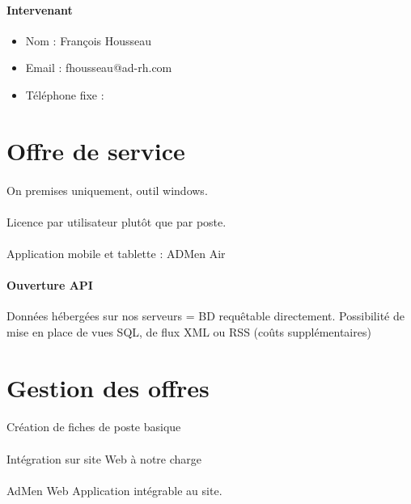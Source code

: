 \paragraph{Intervenant}
\begin{itemize}
	\item Nom : François Housseau
	\item Email : fhousseau@ad-rh.com
	\item Téléphone fixe :
\end{itemize}


\section{Offre de service}
\paragraph{} On premises uniquement, outil windows.

\paragraph{} Licence par utilisateur plutôt que par poste.
\paragraph{} Application mobile et tablette  : ADMen Air
\paragraph{Ouverture API} Données hébergées sur nos serveurs = BD requêtable directement. Possibilité de mise en place de vues SQL, de flux XML ou RSS (coûts supplémentaires)

\section{Gestion des offres}
\paragraph{} Création de fiches de poste basique
\paragraph{} Intégration sur site Web à notre charge
\paragraph{} AdMen Web Application intégrable au site.
